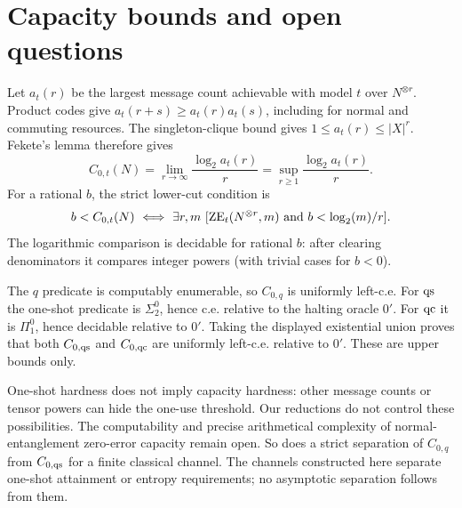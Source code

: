 \section{Capacity bounds and open questions}\label{sec:capacity}
Let $a_t(r)$ be the largest message count achievable with model $t$ over $N^{\otimes r}$. Product codes give $a_t(r+s)\geq a_t(r)a_t(s)$, including for normal and commuting resources. The singleton-clique bound gives $1\leq a_t(r)\leq|X|^r$. Fekete's lemma therefore gives
\[
 C_{0,t}(N)=\lim_{r\to\infty}\frac{\log_2a_t(r)}r
          =\sup_{r\geq1}\frac{\log_2a_t(r)}r.
\]
For a rational $b$, the strict lower-cut condition is
\[
 b<C_{0,t}(N)\ \Longleftrightarrow\
 \exists r,m\ [\ZE_t(N^{\otimes r},m)\ \text{and}\ b<\log_2(m)/r].
\]
The logarithmic comparison is decidable for rational $b$: after clearing denominators it compares integer powers (with trivial cases for $b<0$).

The $q$ predicate is computably enumerable, so $C_{0,q}$ is uniformly left-c.e. For $\mathrm{qs}$ the one-shot predicate is $\Sigma^0_2$, hence c.e. relative to the halting oracle $0'$. For $\mathrm{qc}$ it is $\Pi^0_1$, hence decidable relative to $0'$. Taking the displayed existential union proves that both $C_{0,\mathrm{qs}}$ and $C_{0,\mathrm{qc}}$ are uniformly left-c.e. relative to $0'$. These are upper bounds only.

One-shot hardness does not imply capacity hardness: other message counts or tensor powers can hide the one-use threshold. Our reductions do not control these possibilities. The computability and precise arithmetical complexity of normal-entanglement zero-error capacity remain open. So does a strict separation of $C_{0,q}$ from $C_{0,\mathrm{qs}}$ for a finite classical channel. The channels constructed here separate one-shot attainment or entropy requirements; no asymptotic separation follows from them.
